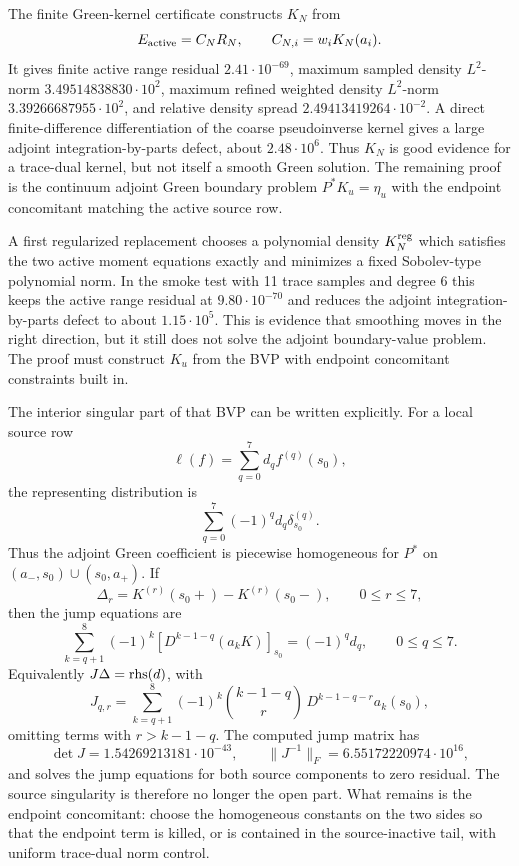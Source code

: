 \documentclass[11pt]{article}
\begin{document}
The finite Green-kernel certificate constructs \(K_N\) from
\[
  E_{\rm active}=C_NR_N,\qquad C_{N,i}=w_iK_N(a_i).
\]
It gives finite active range residual \(2.41\cdot10^{-69}\), maximum sampled
density \(L^2\)-norm \(3.49514838830\cdot10^2\), maximum refined weighted
density \(L^2\)-norm \(3.39266687955\cdot10^2\), and relative density spread
\(2.49413419264\cdot10^{-2}\).  A direct finite-difference differentiation of
the coarse pseudoinverse kernel gives a large adjoint integration-by-parts
defect, about \(2.48\cdot10^6\).  Thus \(K_N\) is good evidence for a
trace-dual kernel, but not itself a smooth Green solution.  The remaining proof
is the continuum adjoint Green boundary problem \(P^\ast K_u=\eta_u\) with the
endpoint concomitant matching the active source row.

A first regularized replacement chooses a polynomial density \(K_N^{\rm reg}\)
which satisfies the two active moment equations exactly and minimizes a fixed
Sobolev-type polynomial norm.  In the smoke test with 11 trace samples and
degree 6 this keeps the active range residual at \(9.80\cdot10^{-70}\) and
reduces the adjoint integration-by-parts defect to about \(1.15\cdot10^5\).
This is evidence that smoothing moves in the right direction, but it still does
not solve the adjoint boundary-value problem.  The proof must construct
\(K_u\) from the BVP with endpoint concomitant constraints built in.

The interior singular part of that BVP can be written explicitly.  For a local
source row
\[
  \ell(f)=\sum_{q=0}^7 d_q f^{(q)}(s_0),
\]
the representing distribution is
\[
  \sum_{q=0}^7(-1)^q d_q\delta_{s_0}^{(q)}.
\]
Thus the adjoint Green coefficient is piecewise homogeneous for \(P^\ast\) on
\((a_-,s_0)\cup(s_0,a_+)\).  If
\[
  \Delta_r=K^{(r)}(s_0+)-K^{(r)}(s_0-),\qquad 0\le r\le7,
\]
then the jump equations are
\[
  \sum_{k=q+1}^8(-1)^k
  \left[D^{k-1-q}(a_kK)\right]_{s_0}
  =(-1)^q d_q,\qquad 0\le q\le7.
\]
Equivalently \(J\Delta={\rm rhs}(d)\), with
\[
  J_{q,r}=\sum_{k=q+1}^8(-1)^k
  {k-1-q\choose r}\,D^{k-1-q-r}a_k(s_0),
\]
omitting terms with \(r>k-1-q\).  The computed jump matrix has
\[
  \det J=1.54269213181\cdot10^{-43},\qquad
  \|J^{-1}\|_F=6.55172220974\cdot10^{16},
\]
and solves the jump equations for both source components to zero residual.
The source singularity is therefore no longer the open part.  What remains is
the endpoint concomitant: choose the homogeneous constants on the two sides so
that the endpoint term is killed, or is contained in the source-inactive tail,
with uniform trace-dual norm control.
\end{document}
